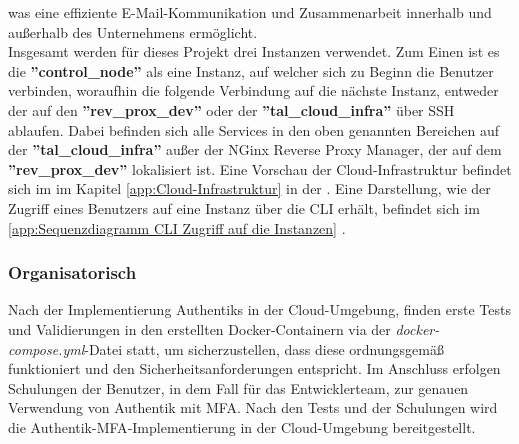 was eine effiziente E-Mail-Kommunikation und Zusammenarbeit innerhalb und außerhalb des Unternehmens ermöglicht.
\\Insgesamt werden für dieses Projekt drei Instanzen verwendet. Zum Einen ist es die \textbf{''control\_node''} 
als eine Instanz, auf welcher sich zu Beginn die Benutzer verbinden, woraufhin die folgende Verbindung auf die nächste Instanz, 
entweder der auf den \textbf{''rev\_prox\_dev''} oder der \textbf{''tal\_cloud\_infra''} über SSH ablaufen. Dabei befinden 
sich alle Services in den oben genannten Bereichen auf der \textbf{''tal\_cloud\_infra''} außer 
der NGinx Reverse Proxy Manager, der auf dem \textbf{''rev\_prox\_dev''} lokalisiert ist. Eine Vorschau der Cloud-Infrastruktur befindet 
sich im  im Kapitel \ref{app:Cloud-Infrastruktur} in der . Eine Darstellung, 
wie der Zugriff eines Benutzers auf eine Instanz über die \acs{CLI} erhält, befindet sich im  
\ref*{app:Sequenzdiagramm CLI Zugriff auf die Instanzen} .

\subsubsection{Organisatorisch}
\label{sec:Organisatorisch}
Nach der Implementierung Authentiks in der Cloud-Umgebung, finden erste Tests und Validierungen in den erstellten 
Docker-Containern via der \textit{docker-compose.yml}-Datei statt, um sicherzustellen, dass diese ordnungsgemäß funktioniert und den 
Sicherheitsanforderungen entspricht. 
Im Anschluss erfolgen Schulungen der Benutzer, in dem Fall für das Entwicklerteam, zur genauen Verwendung von Authentik mit \acs{MFA}. 
Nach den Tests und der Schulungen wird die Authentik-\acs{MFA}-Implementierung in der Cloud-Umgebung bereitgestellt.

